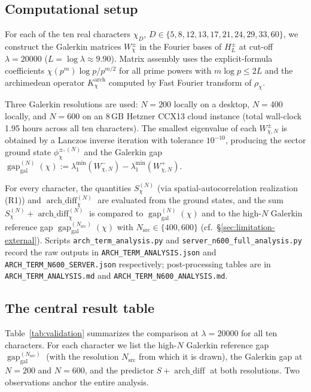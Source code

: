 \documentclass[10pt,twocolumn]{article}
\theoremstyle{definition}
\theoremstyle{remark}
\newcommand{\gap}{\operatorname{gap}}
\newcommand{\chifn}{\chi}
\newcommand{\archdiff}{\operatorname{arch\_diff}}
\begin{document}
\subsection{Computational setup}
\label{sec:validation-setup}

For each of the ten real characters $\chifn_D$,
$D\in\{5,8,12,13,17,21,24,29,33,60\}$, we construct the Galerkin
matrices
$W^\pm_{\chifn}$ in the Fourier bases of $H_L^\pm$ at cut-off
$\lambda=20000$ ($L=\log\lambda\approx 9.90$). Matrix assembly uses the
explicit-formula coefficients $\chifn(p^m)\log p/p^{m/2}$ for all
prime powers with $m\log p\leq 2L$ and the archimedean operator
$K^{\mathrm{arch}}_{\chifn}$ computed by Fast Fourier transform of
$\rho_{\chifn}$.

Three Galerkin resolutions are used: $N=200$ locally on a desktop,
$N=400$ locally, and $N=600$ on an 8\,GB Hetzner CCX13 cloud
instance (total wall-clock 1.95 hours across all ten characters). The
smallest eigenvalue of each $W^\pm_{\chifn,N}$ is obtained by a
Lanczos inverse iteration with tolerance $10^{-10}$, producing the
sector ground state $\phi^{\pm,(N)}_{\chifn}$ and the Galerkin gap
$\gap_{\mathrm{gal}}^{(N)}(\chifn)
:=\lambda_1^{\min}(W^-_{\chifn,N})-\lambda_1^{\min}(W^+_{\chifn,N})$.

For every character, the quantities $S_{\chifn}^{(N)}$ (via
spatial-autocorrelation realization (R1)) and
$\archdiff_{\chifn}^{(N)}$ are evaluated from the ground states, and
the sum $S_{\chifn}^{(N)}+\archdiff_{\chifn}^{(N)}$ is compared to
$\gap_{\mathrm{gal}}^{(N)}(\chifn)$ and to the high-$N$ Galerkin
reference gap $\gap_{\mathrm{gal}}^{(N_{\mathrm{src}})}(\chifn)$ with
$N_{\mathrm{src}}\in\{400,600\}$ (cf.\ \S\ref{sec:limitation-external}). Scripts
\texttt{arch\_term\_analysis.py} and
\texttt{server\_n600\_full\_analysis.py} record the raw outputs in
\texttt{ARCH\_TERM\_ANALYSIS.json} and
\texttt{ARCH\_TERM\_N600\_SERVER.json} respectively; post-processing
tables are in \texttt{ARCH\_TERM\_ANALYSIS.md} and
\texttt{ARCH\_TERM\_N600\_ANALYSIS.md}.

\subsection{The central result table}
\label{sec:validation-table}

Table~\ref{tab:validation} summarizes the comparison at $\lambda=
20000$ for all ten characters. For each character we list the
high-$N$ Galerkin reference gap
$\gap_{\mathrm{gal}}^{(N_{\mathrm{src}})}$ (with the resolution
$N_{\mathrm{src}}$ from which it is drawn), the Galerkin gap at
$N=200$ and $N=600$, and the predictor $S+\archdiff$ at both
resolutions. Two observations anchor the entire analysis.
\end{document}
